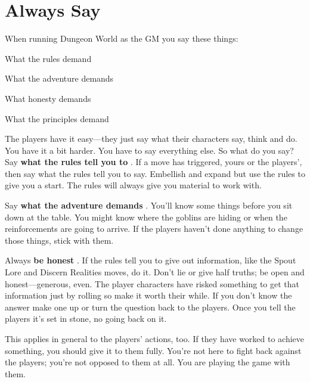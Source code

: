        
\section{Always Say}  
       

When running Dungeon World as the GM you say these things:

       
\startitemize[1,packed]
         
\item What the rules demand

         
\item What the adventure demands

         
\item What honesty demands

         
\item What the principles demand

       
\stopitemize
       

The players have it easy—they just say what their characters say, think and do. You have it a bit harder. You have to say everything else. So what do you say? Say {\bf what the rules tell you to} . If a move has triggered, yours or the players', then say what the rules tell you to say. Embellish and expand but use the rules to give you a start. The rules will always give you material to work with.

       

Say {\bf what the adventure demands} . You'll know some things before you sit down at the table. You might know where the goblins are hiding or when the reinforcements are going to arrive. If the players haven't done anything to change those things, stick with them.

       

Always {\bf be honest} . If the rules tell you to give out information, like the Spout Lore and Discern Realities moves, do it. Don't lie or give half truths; be open and honest—generous, even. The player characters have risked something to get that information just by rolling so make it worth their while. If you don't know the answer make one up or turn the question back to the players. Once you tell the players it's set in stone, no going back on it.

       

This applies in general to the players' actions, too. If they have worked to achieve something, you should give it to them fully. You're not here to fight back against the players; you're not opposed to them at all. You are playing the game with them.

